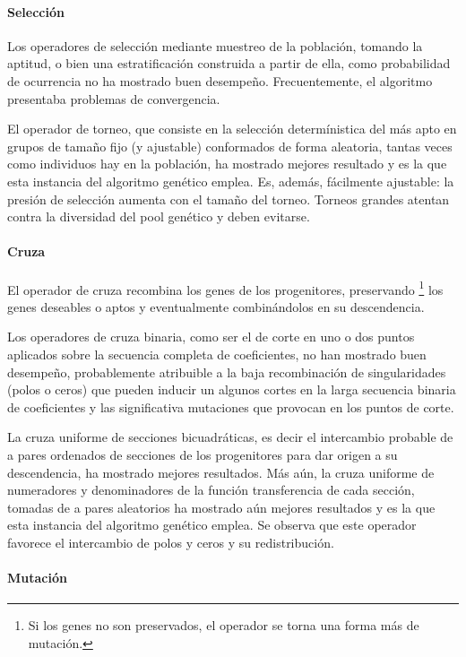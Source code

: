 \documentclass[11pt, journal]{IEEEtran}
\begin{document}
\paragraph{Selección}

Los operadores de selección mediante muestreo de la población, tomando
la aptitud, o bien una estratificación construida a partir de ella, como
probabilidad de ocurrencia no ha mostrado buen desempeño.
Frecuentemente, el algoritmo presentaba problemas de convergencia.

El operador de torneo, que consiste en la selección determínistica del
más apto en grupos de tamaño fijo (y ajustable) conformados de forma
aleatoria, tantas veces como individuos hay en la población, ha mostrado
mejores resultado y es la que esta instancia del algoritmo genético
emplea. Es, además, fácilmente ajustable: la presión de selección
aumenta con el tamaño del torneo. Torneos grandes atentan contra la
diversidad del pool genético y deben evitarse.

\paragraph{Cruza}

El operador de cruza recombina los genes de los progenitores, preservando
\footnote{Si los genes no son preservados, el operador se torna una forma
más de mutación.} los genes deseables o aptos y eventualmente combinándolos
en su descendencia.

Los operadores de cruza binaria, como ser el de corte en uno o dos
puntos aplicados sobre la secuencia completa de coeficientes, no han
mostrado buen desempeño, probablemente atribuible a la baja
recombinación de singularidades (polos o ceros) que pueden inducir un
algunos cortes en la larga secuencia binaria de coeficientes y las
significativa mutaciones que provocan en los puntos de corte.

La cruza uniforme de secciones bicuadráticas, es decir el intercambio
probable de a pares ordenados de secciones de los progenitores para dar
origen a su descendencia, ha mostrado mejores resultados. Más aún, la
cruza uniforme de numeradores y denominadores de la función
transferencia de cada sección, tomadas de a pares aleatorios ha mostrado
aún mejores resultados y es la que esta instancia del algoritmo genético
emplea. Se observa que este operador favorece el intercambio de polos y
ceros y su redistribución.

\paragraph{Mutación}
\end{document}
